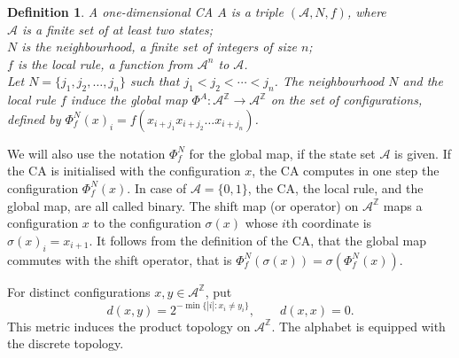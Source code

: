 \documentclass[11pt,a4paper]{article}
\newcommand{\rev}[1]{{\color{blue}#1}}
\newenvironment{revision}{\color{blue}}{}
\newcommand{\rev}[1]{{\color{black}#1}}
\newenvironment{revision}{\color{black}}{}
\newtheorem{deft}[prop]{Definition}
\begin{document}
\begin{deft}
\label{def:CA}
A one-dimensional CA $A$ is a triple $(\mathcal{A}, N, f)$, where \\
\rev{$\mathcal{A}$ is a finite set of at least two states;} \\
$N$ is the neighbourhood, a finite set of integers of size $n$; \\
$f$ is the local rule, a function from $\mathcal{A}^n$ to $\mathcal{A}$. \\
Let $N=\{j_1,j_2, \ldots,j_{n}\}$ such that $j_1 < j_2 < \cdots < j_{n}$.
The neighbourhood $N$ and the local rule $f$ induce the global map
$\Phi^A : \mathcal{A}^\mathbb{Z} \rightarrow \mathcal{A}^\mathbb{Z}$ on the set of configurations, defined by
$\Phi^N_f(x)_{i} = f(x_{i+j_1}x_{i+j_{2}}\ldots x_{i+j_{n}})$.
\end{deft}
We will also use the notation $\Phi^N_f$ for the global map, if the state set $\mathcal{A}$ is given.
If the CA is initialised with the configuration $x$, the CA computes in one step
the configuration $\Phi^N_f(x)$.
In case of $\mathcal{A} = \{0,1\}$, the CA, the local rule, and the global map, are all called binary.
The shift map (or operator) on $\mathcal{A}^\mathbb{Z}$ maps a configuration $x$ to the configuration $\sigma(x)$
whose $i$th coordinate is $\sigma(x)_i = x_{i+1}$.
It follows from the definition of the CA, that the global map commutes with the shift operator, that is
$\Phi^N_f(\sigma(x)) = \sigma(\Phi^N_f(x))$.

\begin{revision}
For distinct configurations $x,y\in\mathcal{A}^{\mathbb Z}$, put
\[
d(x,y)=2^{-\min\{|i|:x_i\ne y_i\}},\qquad d(x,x)=0.
\]
This metric induces the product topology on $\mathcal{A}^{\mathbb Z}$.
The alphabet is equipped with the discrete topology.
\end{revision}
\end{document}
